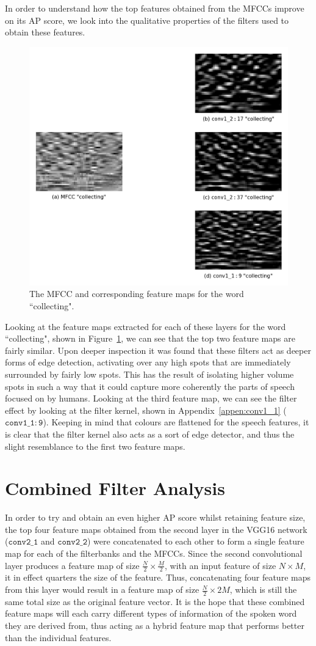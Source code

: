 In order to understand how the top features obtained from the MFCCs improve on its AP score, we look into the qualitative properties of the filters used to obtain these features.

\begin{figure}[h]
    \centering
    \includegraphics[width=0.5\linewidth]{content/fig/mfcc_features.png}
    \caption{The MFCC and corresponding feature maps for the word ``collecting".}
    \label{fig:mfcc_features}
\end{figure}

Looking at the feature maps extracted for each of these layers for the word ``collecting", shown in Figure~\ref{fig:mfcc_features}, we can see that the top two feature maps are fairly similar.
Upon deeper inspection it was found that these filters act as deeper forms of edge detection, activating over any high spots that are immediately surrounded by fairly low spots.
This has the result of isolating higher volume spots in such a way that it could capture more coherently the parts of speech focused on by humans.
Looking at the third feature map, we can see the filter effect by looking at the filter kernel, shown in Appendix~\ref{appen:conv1_1} ($\mathtt{conv1\_1:9}$).
Keeping in mind that colours are flattened for the speech features, it is clear that the filter kernel also acts as a sort of edge detector, and thus the slight resemblance to the first two feature maps.

\section{Combined Filter Analysis}

In order to try and obtain an even higher AP score whilst retaining feature size, the top four feature maps obtained from the second layer in the VGG16 network ($\mathtt{conv2\_1}$ and $\mathtt{conv2\_2}$) were concatenated to each other to form a single feature map for each of the filterbanks and the MFCCs.
Since the second convolutional layer produces a feature map of size $\frac{N}{2} \times \frac{M}{2}$, with an input feature of size $N \times M$, it in effect quarters the size of the feature.
Thus, concatenating four feature maps from this layer would result in a feature map of size $\frac{N}{2} \times 2M$, which is still the same total size as the original feature vector.
It is the hope that these combined feature maps will each carry different types of information of the spoken word they are derived from, thus acting as a hybrid feature map that performs better than the individual features.

